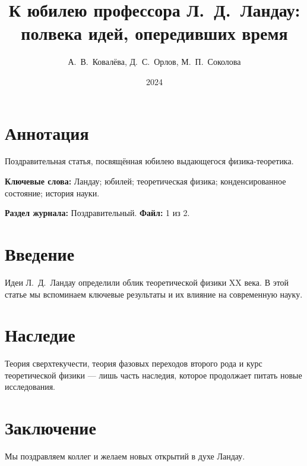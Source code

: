 \documentclass[12pt]{article}
\title{К юбилею профессора Л.~Д.~Ландау:\\ полвека идей, опередивших время}
\author{А.~В.~Ковалёва, Д.~С.~Орлов, М.~П.~Соколова}
\date{2024}
\begin{document}
\maketitle

\section*{Аннотация}
Поздравительная статья, посвящённая юбилею выдающегося физика-теоретика. 

\vspace{0.5cm}
\noindent\textbf{Ключевые слова:} Ландау; юбилей; теоретическая физика; конденсированное состояние; история науки.

\vspace{0.3cm}
\noindent\textbf{Раздел журнала:} Поздравительный. \quad \textbf{Файл:} 1 из 2.

\section{Введение}
Идеи Л.~Д.~Ландау определили облик теоретической физики XX века. В этой статье мы вспоминаем ключевые результаты и их влияние на современную науку.

\section{Наследие}
Теория сверхтекучести, теория фазовых переходов второго рода и курс теоретической физики — лишь часть наследия, которое продолжает питать новые исследования.

\section{Заключение}
Мы поздравляем коллег и желаем новых открытий в духе Ландау.
\end{document}
